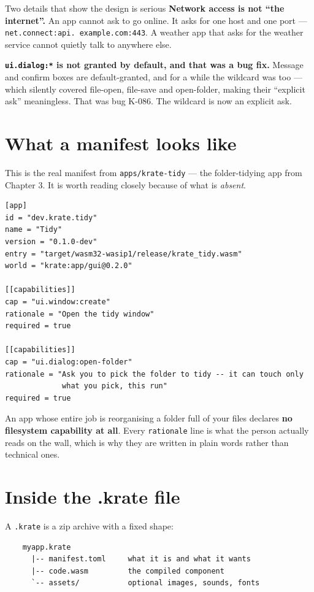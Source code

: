 \documentclass[11pt,a4paper]{report}
\begin{document}
\begin{plainbox}{Two details that show the design is serious}
\textbf{Network access is not ``the internet''.} An app cannot ask to go
online. It asks for one host and one port --- \texttt{net.connect:api.\allowbreak
example.com:443}. A weather app that asks for the weather service cannot
quietly talk to anywhere else.

\textbf{\texttt{ui.dialog:*} is not granted by default, and that was a
bug fix.} Message and confirm boxes are default-granted, and for a while
the wildcard was too --- which silently covered file-open, file-save and
open-folder, making their ``explicit ask'' meaningless. That was bug K-086.
The wildcard is now an explicit ask.
\end{plainbox}

\section{What a manifest looks like}

This is the real manifest from \texttt{apps/krate-tidy} --- the
folder-tidying app from Chapter 3. It is worth reading closely because of
what is \emph{absent}.

\begin{verbatim}
[app]
id = "dev.krate.tidy"
name = "Tidy"
version = "0.1.0-dev"
entry = "target/wasm32-wasip1/release/krate_tidy.wasm"
world = "krate:app/gui@0.2.0"

[[capabilities]]
cap = "ui.window:create"
rationale = "Open the tidy window"
required = true

[[capabilities]]
cap = "ui.dialog:open-folder"
rationale = "Ask you to pick the folder to tidy -- it can touch only
             what you pick, this run"
required = true
\end{verbatim}

An app whose entire job is reorganising a folder full of your files
declares \textbf{no filesystem capability at all}. Every \texttt{rationale}
line is what the person actually reads on the wall, which is why they are
written in plain words rather than technical ones.

\section{Inside the .krate file}

A \texttt{.krate} is a zip archive with a fixed shape:

\begin{verbatim}
    myapp.krate
      |-- manifest.toml     what it is and what it wants
      |-- code.wasm         the compiled component
      `-- assets/           optional images, sounds, fonts
\end{verbatim}
\end{document}
